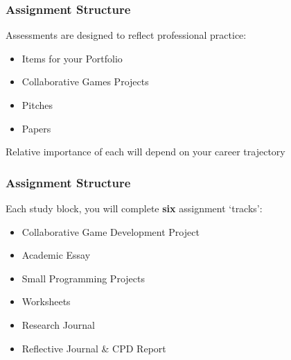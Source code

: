 \begin{frame}
	\frametitle{Assignment Structure}
	
	
	Assessments are designed to reflect professional practice:
	
	\begin{itemize}
		\item Items for your Portfolio
		\item Collaborative Games Projects
		\item Pitches
		\item Papers
	\end{itemize}

	Relative importance of each will depend on your career trajectory

\end{frame}










\begin{frame}
	\frametitle{Assignment Structure}
	
	Each study block, you will complete \textbf{six} assignment `tracks':
	
	\begin{itemize}
		\item Collaborative Game Development Project
		\item Academic Essay
		\item Small Programming Projects
		\item Worksheets
		\item Research Journal
		\item Reflective Journal \& CPD Report
	\end{itemize}

\end{frame}

